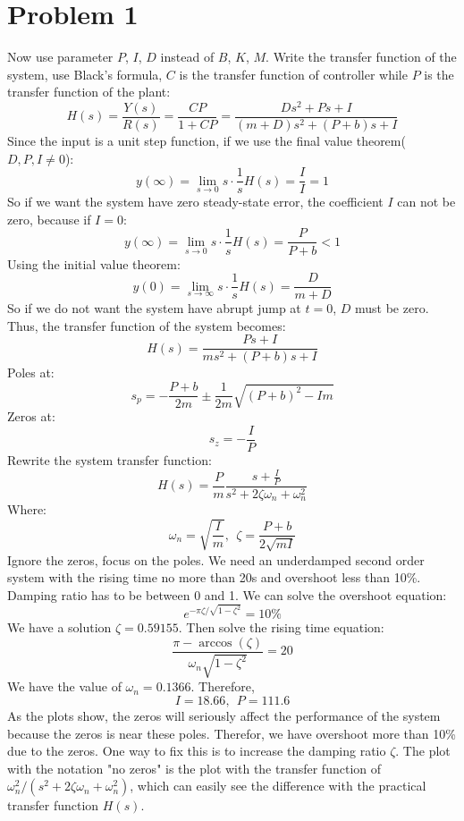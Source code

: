 \documentclass[a4paper]{article}
\begin{document}
\section{Problem 1}
Now use parameter $P$, $I$, $D$ instead of $B$, $K$, $M$. 
Write the transfer function of the system, use Black's formula, $C$ is the transfer function of controller while $P$ is the transfer function of the plant:
$$
H(s) = \frac{Y(s)}{R(s)} = \frac{CP}{1+CP} = \frac{Ds^2+Ps+I}{(m+D)s^2+(P+b)s+I}
$$
Since the input is a unit step function, if we use the final value theorem($D,P,I\neq 0$):
$$
y(\infty) = \lim_{s\rightarrow 0}s\cdot \frac1s H(s) = \frac{I}{I} = 1
$$
So if we want the system have zero steady-state error, the coefficient $I$ can not be zero, because if $I = 0$:
$$
y(\infty) = \lim_{s\rightarrow 0}s\cdot \frac1s H(s) = \frac{P}{P+b}<1
$$
Using the initial value theorem:
$$
y(0) = \lim_{s\rightarrow \infty}s\cdot \frac1s H(s) = \frac{D}{m+D}
$$
So if we do not want the system have abrupt jump at $t = 0$, $D$ must be zero. Thus, the transfer function of the system becomes:
$$
H(s) = \frac{Ps+I}{ms^2+(P+b)s+I}
$$
Poles at:
$$
s_p = -\frac{P+b}{2m}\pm \frac{1}{2m}\sqrt{(P+b)^2-Im}
$$
Zeros at:
$$
s_z = -\frac IP
$$
Rewrite the system transfer function:
$$
H(s) = \frac{P}{m}\frac{s+\frac IP}{s^2+2\zeta \omega_n + \omega_n^2}
$$
Where:
$$
\omega_n = \sqrt{\frac Im},\ \ \zeta = \frac{P+b}{2\sqrt{mI}}
$$
Ignore the zeros, focus on the poles. We need an underdamped second order system with the rising time no more than 20s and overshoot less than 10\%. Damping ratio has to be between 0 and 1. We can solve the overshoot equation:
$$
e^{-\pi\zeta/\sqrt{1-\zeta^2}} = 10\%
$$
We have a solution $\zeta = 0.59155$. Then solve the rising time equation:
$$
\frac{\pi-\arccos(\zeta)}{\omega_n\sqrt{1-\zeta^2}} = 20
$$
We have the value of $\omega_n = 0.1366$. Therefore, 
$$
I = 18.66,\ \ P = 111.6
$$
As the plots show, the zeros will seriously affect the performance of the system because the zeros is near these poles. Therefor, we have overshoot more than 10\% due to the zeros. One way to fix this is to increase the damping ratio $\zeta$. The plot with the notation "no zeros" is the plot with the transfer function of $\omega_n^2/(s^2+2\zeta \omega_n + \omega_n^2)$, which can easily see the difference with the practical transfer function $H(s)$. 
\end{document}
